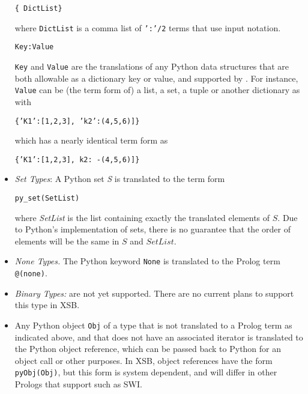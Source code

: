\begin{itemize}
         \verb|{ DictList} |

         where {\tt DictList} is a comma list of {\tt ':'/2} terms
         that use input notation.

         {\tt Key:Value}

         {\tt Key} and {\tt Value} are the translations of any Python
         data structures that are both allowable as a dictionary key
         or value, and supported by \janus .  For instance, {\tt
           Value} can be (the term form of) a list, a set, a tuple or
         another dictionary as with

         {\tt \{'K1':[1,2,3], 'k2':(4,5,6)]\}}

         which has a nearly identical term form as

         {\tt \{'K1':[1,2,3], k2: -(4,5,6)]\}}

         \item {\em Set Types}: A Python set {\em S} is translated to
         the term form

         {\tt py\_set(SetList)}

         where {\em SetList} is the list containing exactly the
         translated elements of $S$.  Due to Python's implementation
         of sets, there is no guarantee that the order of elements
         will be the same in $S$ and $SetList$.
       \item {\em None Types.} The Python keyword {\tt None} is
         translated to the Prolog term {\tt @(none)}. 
       \item {\em Binary Types:} are not yet supported.  There are no
         current plans to support this type in XSB.
     \item Any Python object {\tt Obj} of a type that is not
       translated to a Prolog term as indicated above, and
       that does not have an associated iterator is translated to the
       Python object reference, which can be passed back to Python for
       an object call or other purposes.  In XSB, object references
       have the form {\tt pyObj(Obj)}, but this form is system
       dependent, and will differ in other Prologs that support
       \janus{} such as SWI.
\end{itemize}


